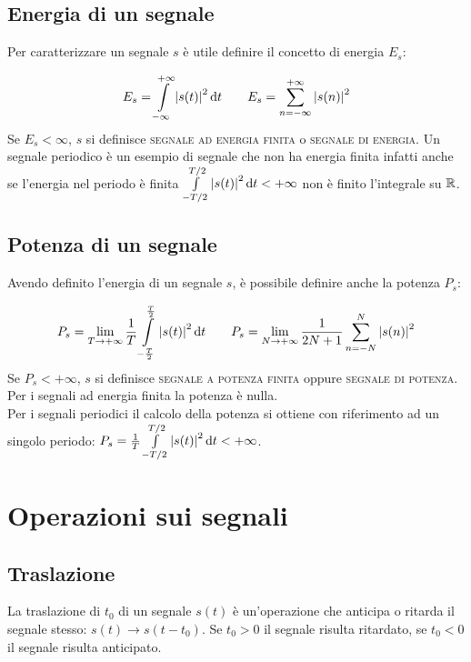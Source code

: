 \subsection{Energia di un segnale}
Per caratterizzare un segnale $s$ è utile definire il concetto di energia $E_s$:

\begin{equation}
\label{eq:segnale_energia}
	E_s=\int\limits_{-\infty}^{+\infty}{\left|{s(t)}\right|^2}{\,\mathop{}\!\mathrm{d}{t}} \qquad E_s=\sum_{n=-\infty}^{+\infty}\left|{s(n)}\right|^2
\end{equation}
Se $E_s < \infty$, $s$ si definisce \textsc{segnale ad energia finita} o \textsc{segnale di energia}. \newline Un segnale periodico è un esempio di segnale che non ha energia finita infatti anche se l'energia nel periodo è finita $\int\limits_{-T/2}^{T/2}{\left|{s(t)}\right|^2}{\,\mathop{}\!\mathrm{d}{t}}<+\infty$ non è finito l'integrale su $\mathbb{R}$.

\subsection{Potenza di un segnale}
Avendo definito l'energia di un segnale $s$, è possibile definire anche la potenza $P_s$:

\begin{equation}
\label{eq:segnale_potenza}
	P_s=\lim\limits_{T\to+\infty}{\frac{1}{T}\int\limits_{-\frac{T}{2}}^{\frac{T}{2}}{\left|{s(t)}\right|^2}{\,\mathop{}\!\mathrm{d}{t}}}\qquad
	P_s=\lim\limits_{N\to+\infty}{\frac{1}{2N+1}\sum_{n=-N}^{N}{\left|{s(n)}\right|^2}}
\end{equation}
Se $P_s<+\infty$, $s$ si definisce \textsc{segnale a potenza finita} oppure \textsc{segnale di potenza}. \\ Per i segnali ad energia finita la potenza è nulla. \\ Per i segnali periodici il calcolo della potenza si ottiene con riferimento ad un singolo periodo: $P_s=\frac{1}{T}\int\limits_{-T/2}^{T/2}{\left|{s(t)}\right|^2}{\,\mathop{}\!\mathrm{d}{t}}<+\infty$.

\section{Operazioni sui segnali}
\subsection{Traslazione}
La traslazione di $t_0$ di un segnale $s(t)$ è un'operazione che anticipa o ritarda il segnale stesso:
$s(t) \to s(t-t_0)$. Se $t_0>0$ il segnale risulta ritardato, se $t_0<0$ il segnale risulta anticipato.

